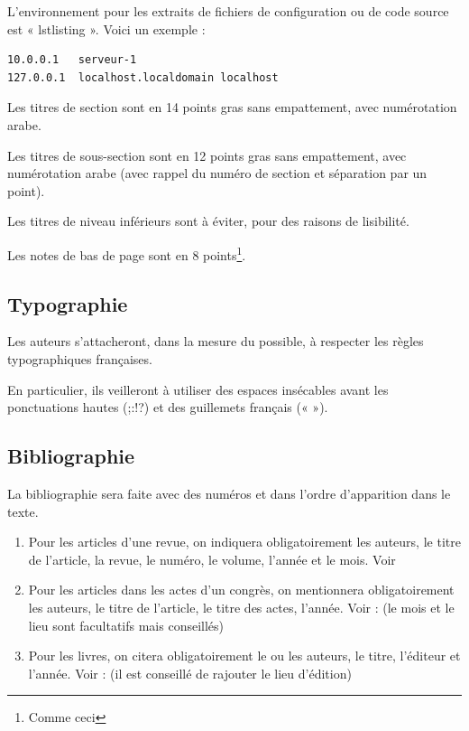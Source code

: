 \documentclass[11pt]{jres}
\begin{document}
L'environnement pour les extraits de fichiers de configuration ou 
de code source  est « lstlisting ». Voici un exemple :

\begin{lstlisting}
10.0.0.1   serveur-1
127.0.0.1  localhost.localdomain localhost
\end{lstlisting}

Les titres de section sont en 14 points gras sans empattement, avec
numérotation arabe.

Les titres de sous-section sont en 12 points gras sans empattement,
avec numérotation arabe (avec rappel du numéro de section et
séparation par un point).

Les titres de niveau inférieurs sont à éviter, pour des raisons de
lisibilité.

Les notes de bas de page sont en 8 points\footnote{Comme ceci}. 

\subsection{Typographie}

Les auteurs s'attacheront, dans la mesure du possible, à respecter les
règles typographiques françaises.

En particulier, ils veilleront à utiliser des espaces insécables avant
les ponctuations hautes (;:!?) et des guillemets français (« »).

\subsection{Bibliographie}

La bibliographie sera faite avec des numéros et dans l'ordre
d'apparition dans le texte.

\begin{enumerate}

\item Pour les articles d'une revue, on indiquera obligatoirement les
  auteurs, le titre de l'article, la revue, le numéro, le volume,
  l'année et le mois. Voir \cite{exemple1}

\item Pour les articles dans les actes d'un congrès, on mentionnera
  obligatoirement les auteurs, le titre de l'article, le titre des
  actes, l'année. Voir : \cite{exemple2} (le mois et le lieu sont
  facultatifs mais conseillés)

\item Pour les livres, on citera obligatoirement le ou les auteurs, le
  titre, l'éditeur et l'année. Voir : \cite{exemple3} (il est conseillé de
  rajouter le lieu d'édition)

\end{enumerate}
\end{document}
